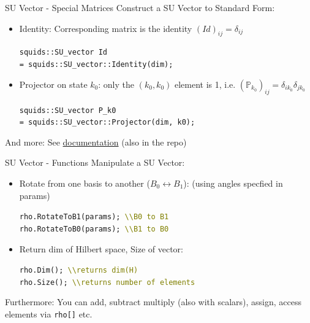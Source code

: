 \documentclass[]{beamer}
\begin{document}
\begin{frame}{SU Vector - Special Matrices}
  Construct a SU Vector to Standard Form:
  \begin{itemize}
    \item Identity: Corresponding matrix is the identity \((Id)_{ij} = \delta_{ij}\)
    \begin{tcolorbox}[colback=gray!5!white]
      \texttt{squids::SU\_vector Id }\\
      \texttt{= squids::SU\_vector::Identity(dim);}
    \end{tcolorbox}
    \item Projector on state \(k_0\): only the \((k_0,k_0)\) element is 1, i.e. \((\mathbb{P}_{k_0})_{ij} = \delta_{i k_0} \delta_{j k_0}\)
    \begin{tcolorbox}[colback=gray!5!white]
      \texttt{squids::SU\_vector P\_k0} \\
      \texttt{= squids::SU\_vector::Projector(dim, k0);}
    \end{tcolorbox}
  \end{itemize}
  And more: See \href{https://arxiv.org/abs/1412.3832}{documentation} (also in the repo)
\end{frame}

\begin{frame}{SU Vector - Functions}
  Manipulate a SU Vector:
  \begin{itemize}
    \item Rotate from one basis to another (\(B_0 \leftrightarrow B_1\)): (using angles specfied in params)
    \begin{tcolorbox}[colback=gray!5!white]
      \texttt{rho.RotateToB1(params); \textcolor{olive}{\textbackslash \textbackslash B0 to B1}} \\
      \texttt{rho.RotateToB0(params); \textcolor{olive}{\textbackslash \textbackslash B1 to B0}}
    \end{tcolorbox}
    \item Return dim of Hilbert space, Size of vector:
    \begin{tcolorbox}[colback=gray!5!white]
      \texttt{rho.Dim(); \textcolor{olive}{\textbackslash \textbackslash returns dim(H)}} \\
      \texttt{rho.Size(); \textcolor{olive}{\textbackslash \textbackslash returns number of elements}}
    \end{tcolorbox}
  \end{itemize}
  Furthermore: You can add, subtract multiply (also with scalars), assign, access elements via \texttt{rho[]} etc.
\end{frame}
\end{document}

